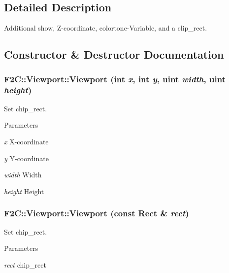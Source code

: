 \subsection{Detailed Description}
Additional show, Z-\/coordinate, colortone-\/Variable, and a clip\_\-rect. 

\subsection{Constructor \& Destructor Documentation}
\hypertarget{class_f2_c_1_1_viewport_a95b9c60d6537d37caf560a93c509735b}{
\subsubsection[{Viewport}]{\setlength{\rightskip}{0pt plus 5cm}F2C::Viewport::Viewport (int {\em x}, \/  int {\em y}, \/  {\bf uint} {\em width}, \/  {\bf uint} {\em height})}}
\label{class_f2_c_1_1_viewport_a95b9c60d6537d37caf560a93c509735b}


Set chip\_\-rect. 
\begin{DoxyParams}{Parameters}
\item[{\em x}]X-\/coordinate \item[{\em y}]Y-\/coordinate \item[{\em width}]Width \item[{\em height}]Height \end{DoxyParams}
\hypertarget{class_f2_c_1_1_viewport_a8d66a03451361d3bc5e783242e6a5dfe}{
\subsubsection[{Viewport}]{\setlength{\rightskip}{0pt plus 5cm}F2C::Viewport::Viewport (const {\bf Rect} \& {\em rect})}}
\label{class_f2_c_1_1_viewport_a8d66a03451361d3bc5e783242e6a5dfe}


Set chip\_\-rect. 
\begin{DoxyParams}{Parameters}
\item[{\em rect}]chip\_\-rect \end{DoxyParams}
